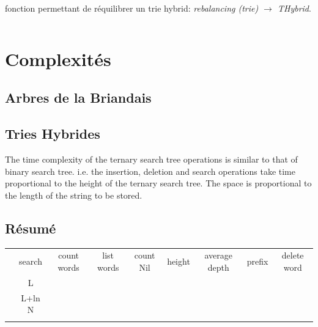 \documentclass[a4paper,8pt]{report}
\begin{document}
fonction permettant de r\'equilibrer un trie hybrid: \textit{rebalancing (trie) $\rightarrow$ THybrid}.
\begin{verbatim}
\end{verbatim}

\chapter{Complexit\'es}
\section*{Arbres de la Briandais}\label{sec:name}

\section*{Tries Hybrides}\label{sec:name}
 The time complexity of the ternary search tree operations is similar to that of binary search tree. i.e. the insertion, deletion and search operations take time proportional to the height of the ternary search tree. The space is proportional to the length of the string to be stored.

\section*{R\'esum\'e}\label{sec:name}

\begin{table}[h]
\begin{tabular}{ccccccccc}
                                                           & \cellcolor[HTML]{C0C0C0}search & \cellcolor[HTML]{C0C0C0}count words & \cellcolor[HTML]{C0C0C0}list words & \cellcolor[HTML]{C0C0C0}count Nil & \cellcolor[HTML]{C0C0C0}height & \cellcolor[HTML]{C0C0C0}average depth & \cellcolor[HTML]{C0C0C0}prefix & \cellcolor[HTML]{C0C0C0}delete word \\
\cellcolor[HTML]{C0C0C0}{\color[HTML]{656565} Briandais}   & \cellcolor[HTML]{EFEFEF}L      &                                     & \cellcolor[HTML]{EFEFEF}           &                                   & \cellcolor[HTML]{EFEFEF}       &                                       & \cellcolor[HTML]{EFEFEF}       &                                     \\
\cellcolor[HTML]{C0C0C0}{\color[HTML]{656565} Hybrid Trie} & \cellcolor[HTML]{EFEFEF}L+ln N &                                     & \cellcolor[HTML]{EFEFEF}           &                                   & \cellcolor[HTML]{EFEFEF}       &                                       & \cellcolor[HTML]{EFEFEF}       &                                     \\
                                                           &                                &                                     &                                    &                                   &      
\end{tabular}
\end{table}
\end{document}
